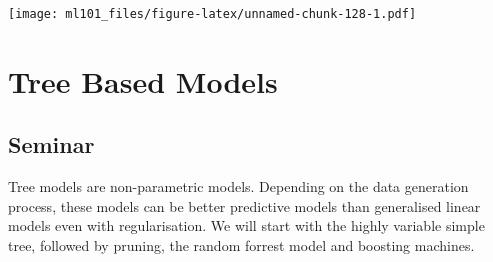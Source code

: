 \documentclass[]{article}
\newenvironment{Shaded}{\begin{snugshade}}{\end{snugshade}}
\newcommand{\DataTypeTok}[1]{\textcolor[rgb]{0.13,0.29,0.53}{#1}}
\newcommand{\DecValTok}[1]{\textcolor[rgb]{0.00,0.00,0.81}{#1}}
\newcommand{\KeywordTok}[1]{\textcolor[rgb]{0.13,0.29,0.53}{\textbf{#1}}}
\newcommand{\NormalTok}[1]{#1}
\newcommand{\OperatorTok}[1]{\textcolor[rgb]{0.81,0.36,0.00}{\textbf{#1}}}
\newcommand{\OtherTok}[1]{\textcolor[rgb]{0.56,0.35,0.01}{#1}}
\newcommand{\StringTok}[1]{\textcolor[rgb]{0.31,0.60,0.02}{#1}}
\begin{document}
\begin{Shaded}
\end{Shaded}

\texttt{[image: ml101\_files/figure-latex/unnamed-chunk-128-1.pdf]}

\hypertarget{tree-based-models}{%
\section{Tree Based Models}\label{tree-based-models}}

\hypertarget{seminar-5}{%
\subsection{Seminar}\label{seminar-5}}

Tree models are non-parametric models. Depending on the data generation process, these models can be better predictive models than generalised linear models even with regularisation. We will start with the highly variable simple tree, followed by pruning, the random forrest model and boosting machines.
\end{document}
